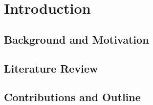 \section{Introduction}
\label{sec:introduction}

\subsection{Background and Motivation}
\label{sec:background}

\subsection{Literature Review}
\label{sec:literature}

\subsection{Contributions and Outline}
\label{sec:contributions}
